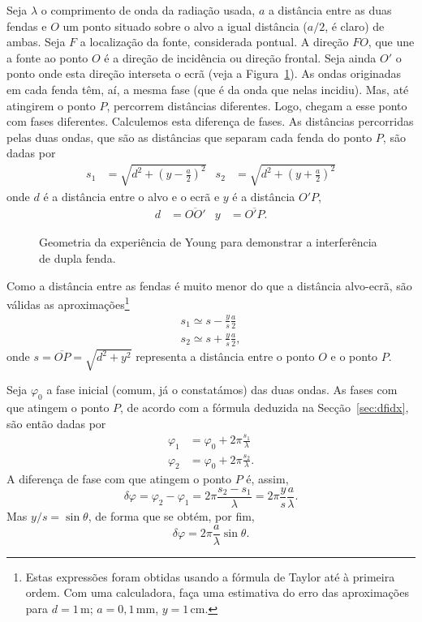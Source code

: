 Seja $\lambda$ o comprimento de onda da radiação usada, $a$ a distância entre
as duas fendas e $O$ um ponto situado sobre o alvo a igual distância ($a/2$, é
claro) de ambas. Seja $F$ a localização da fonte, considerada pontual. A direção
$FO$, que une a fonte ao ponto $O$ é a direção de incidência ou direção frontal.
Seja ainda $O'$ o ponto onde esta direção interseta o ecrã (veja a
Figura~\ref{fig:40-040}).  As ondas originadas em cada fenda têm, aí, a mesma
fase (que é da onda que nelas incidiu). Mas, até atingirem o ponto $P$,
percorrem distâncias diferentes. Logo, chegam a esse ponto com fases diferentes.
Calculemos esta diferença de fases. As distâncias percorridas pelas duas ondas,
que são as distâncias que separam cada fenda do ponto $P$, são dadas por
\begin{align*}
    s_1&=\sqrt{d^2+\left(y-\frac{a}{2}\right)^2}&
    s_2&=\sqrt{d^2+\left(y+\frac{a}{2}\right)^2}
\end{align*}
onde $d$ é a distância entre o alvo e o ecrã e $y$ é a distância $O'P$,
\begin{align*}
d&=\overline{OO'}&y&=\overline{O'P}.%
\end{align*}
\begin{figure}[htb]
    {\centering
        
        \caption{Geometria da experiência de Young para demonstrar a
        interferência de dupla fenda.\label{fig:40-040}}

    }
\end{figure}
Como a distância entre as fendas é muito menor do que a distância alvo-ecrã,
são válidas as aproximações\footnote{Estas expressões foram obtidas usando a
fórmula de Taylor até à primeira ordem. Com uma calculadora, faça uma estimativa
do erro das aproximações para $d=1$\,m; $a=0,1$\,mm, $y=1$\,cm.}
\begin{align*}
s_1\simeq s-\frac{y}{s}\frac{a}{2}\\
s_2\simeq s+\frac{y}{s}\frac{a}{2},
\end{align*}
onde $s=\overline{OP}=\sqrt{d^2+y^2}$ representa a distância entre o ponto $O$ e
o ponto $P$.

Seja $\varphi_0$ a fase inicial (comum, já o constatámos) das duas ondas. As
fases com que atingem o ponto $P$, de acordo com a fórmula deduzida na
Secção~\ref{sec:dfidx}, são então dadas por
\begin{align*}
\varphi_1 &= \varphi_0+2\pi\frac{s_1}{\lambda}\\
\varphi_2 &= \varphi_0+2\pi\frac{s_2}{\lambda}.
\end{align*}
A diferença de fase com que atingem o ponto $P$ é, assim,
\begin{equation*}
\delta\varphi = \varphi_2-\varphi_1 =2\pi\frac{s_2-s_1}{\lambda}=
2\pi\frac{y}{s}\frac{a}{\lambda}.
\end{equation*}
Mas $y/s=\sin\theta$, de forma que se obtém, por fim,
\begin{equation*}
\delta\varphi = 2\pi\frac{a}{\lambda}\sin\theta.
\end{equation*}

